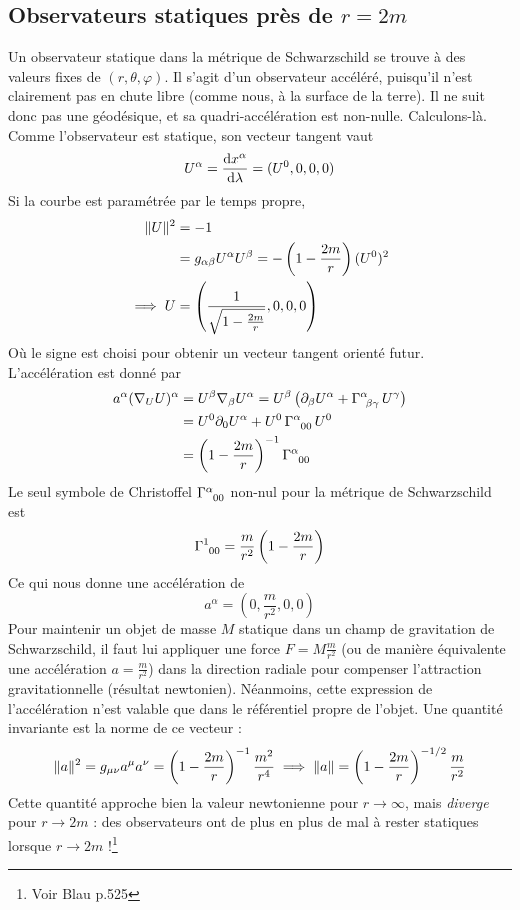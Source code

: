 \subsection{Observateurs statiques près de $r=2m$}
Un observateur statique dans la métrique de Schwarzschild se trouve à des valeurs fixes de $(r,\theta, \varphi)$. Il s'agit d'un observateur accéléré, puisqu'il n'est clairement pas en chute libre (comme nous, à la surface de la terre). Il ne suit donc pas une géodésique, et sa quadri-accélération est non-nulle. Calculons-là. Comme l'observateur est statique, son vecteur tangent vaut
\begin{equation}
    U^\alpha = \frac{\mathrm{d} x^\alpha}{\mathrm{d} \lambda} = (U^0,0,0,0)
\end{equation}
Si la courbe est paramétrée par le temps propre, 
\begin{align}
    \lVert U \rVert^2 &= -1\\
    &= g_{\alpha\beta} U^\alpha U^\beta = - \left( 1 - \frac{2m}{r} \right) (U^0)^2\\
    \implies U &= \left( \frac{1}{\sqrt{1 - \frac{2m}{r}}},0,0,0 \right)
\end{align}
Où le signe est choisi pour obtenir un vecteur tangent orienté futur. L'accélération est donné par
\begin{align}
    a^\alpha (\nabla_U U)^\alpha &= U^\beta \nabla_\beta U^\alpha = U^\beta \lt \pd_\beta U^\alpha + \Gamma\indices{^\alpha_{\!\beta \gamma}} \,U^\gamma \rt\\
    &= U^0 \pd_0 U^\alpha + U^0 \, \Gamma\indices{^\alpha_{00}} \, U^0\\
    &= \lt 1 - \frac{2m}{r} \rt^{-1} \Gamma\indices{^\alpha_{00}}
\end{align}
Le seul symbole de Christoffel $\Gamma\indices{^\alpha_{00}}$ non-nul pour la métrique de Schwarzschild est 
\begin{equation}
    \Gamma\indices{^1_{00}} = \frac{m}{r^2} \lt 1 - \frac{2m}{r} \rt 
\end{equation}
Ce qui nous donne une accélération de
\begin{equation}
    a^\alpha = (0, \frac{m}{r^2},0,0)
\end{equation}
Pour maintenir un objet de masse $M$ statique dans un champ de gravitation de Schwarzschild, il faut lui appliquer une force $F = M \frac{m}{r^2}$ (ou de manière équivalente une accélération $a = \frac{m}{r^2}$) dans la direction radiale pour compenser l'attraction gravitationnelle (résultat newtonien). Néanmoins, cette expression de l'accélération n'est valable que dans le référentiel propre de l'objet. Une quantité invariante est la norme de ce vecteur : 
\begin{equation}
    \lVert a \rVert^2 = g_{\mu\nu} a^\mu a^\nu = \left( 1 - \frac{2m}{r} \right)^{-1} \frac{m^2}{r^4} \implies \lVert a \rVert = \left( 1 - \frac{2m}{r} \right)^{-1/2} \frac{m}{r^2}
\end{equation}
Cette quantité approche bien la valeur newtonienne pour $r\to \infty$, mais \emph{diverge} pour $r \to 2m$ : des observateurs ont de plus en plus de mal à rester statiques lorsque $r \to 2m$ !\footnote{Voir Blau p.525}
